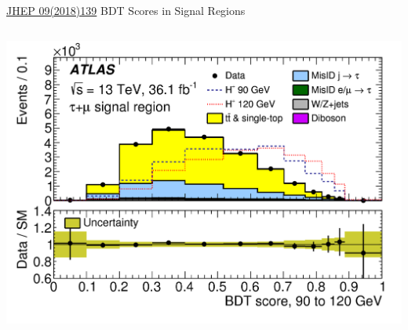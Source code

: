 \documentclass[aspectratio=169,xcolor=table]{beamer}
\begin{document}
    \begin{frame}{\href{https://link.springer.com/article/10.1007/JHEP09(2018)139}{JHEP 09(2018)139} BDT Scores in Signal Regions}
      \begin{columns}
        \includegraphics[height=.24\textheight,keepaspectratio=true]{taumu_SR_2018/taumu_SR_90to120_2018.png}


\end{columns}
\end{frame}
\end{document}
